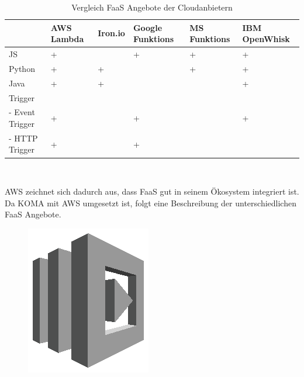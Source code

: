 \documentclass[
12pt,
english,
ngerman,
headsepline,
twoside,
openright,
numbers=noenddot,version=first
]{scrreprt}
\begin{document}
\begin{table}[H]
	\centering{}
	\label{comparison-FaaS}
	\begin{tabular}{ p{7em} | p{2cm} | p{2cm} | p{2cm} | p{2cm} | p{2cm} }
		& AWS Lambda & Iron.io & Google Funktions & MS Funktions & IBM OpenWhisk  \\
		\hline
		JS & + &  & + & + & + \\
		\hline
		Python & + & + &  & + & + \\
		\hline
		Java & + & + &  &  & + \\
		\hline
		Trigger &  &  &  &  &  \\
		\hline
		- Event Trigger  & + &  & + &  & + \\
		\hline
		- HTTP Trigger & + &  & + &  &  \\
	\end{tabular}
\\
\caption{Vergleich \acrshort{FaaS} Angebote der Cloudanbietern}
\end{table}

\acrshort{AWS} zeichnet sich dadurch aus, dass \acrshort{FaaS} gut in seinem Ökosystem integriert ist. Da \acrshort{KOMA} mit \acrshort{AWS} umgesetzt ist, folgt eine Beschreibung der unterschiedlichen \acrshort{FaaS} Angebote.


\begin{figure}
	\includegraphics[width=0.9\linewidth]{./pics/aws/Compute_GRAYSCALE_AWSLambda.eps}
\end{figure}
\end{document}
